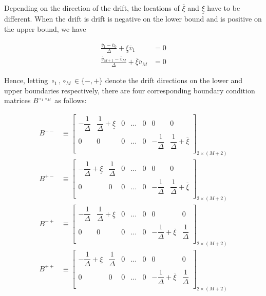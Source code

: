 \documentclass[11pt]{article}
\theoremstyle{definition}
\begin{document}
Depending on the direction of the drift, the locations of $\overline{\xi}$ and $\underline{\xi}$ have to be different. When the drift is drift is negative on the lower bound and is positive on the upper bound, we have

\begin{align}
\frac{\overline{v}_1 - \overline{v}_0}{\Delta} + \underline{\xi} \overline{v}_1 &= 0 \label{eq:mixed-BC1-negative}  \\
\frac{\overline{v}_{M+1} - \overline{v}_M}{\Delta} + \overline{\xi} \overline{v}_{M} &= 0 \label{eq:mixed-BC2-positive}
\end{align}

Hence, letting $\circ_1, \circ_M \in \{-, +\}$ denote the drift directions on the lower and upper boundaries respectively, there are four corresponding boundary condition matrices $B^{\circ_1 \circ_M}$ as follows:
 
\begin{align}
B^{--} &\equiv 
\begin{bmatrix}
-\dfrac{1}{\Delta} & \dfrac{1}{\Delta}  + \underline{\xi} & 0 & \dots & 0 & 0 & 0 \\
0 & 0 & 0 & \dots & 0 & -\dfrac{1}{\Delta} & \dfrac{1}{\Delta} + \overline{\xi}\\
\end{bmatrix}_{2 \times (M+2)} \\
B^{+-} &\equiv 
\begin{bmatrix}
-\dfrac{1}{\Delta} + \underline{\xi} & \dfrac{1}{\Delta} & 0 & \dots & 0 & 0 & 0 \\
0 & 0 & 0 & \dots & 0 & -\dfrac{1}{\Delta} & \dfrac{1}{\Delta} + \overline{\xi}\\
\end{bmatrix}_{2 \times (M+2)} \\
B^{-+} &\equiv 
\begin{bmatrix}
-\dfrac{1}{\Delta}  & \dfrac{1}{\Delta} + \underline{\xi} & 0 & \dots & 0 & 0 & 0 \\
0 & 0 & 0 & \dots & 0 & -\dfrac{1}{\Delta}+ \overline{\xi} & \dfrac{1}{\Delta}\\
\end{bmatrix}_{2 \times (M+2)} \\
B^{++} &\equiv 
\begin{bmatrix}
-\dfrac{1}{\Delta} + \underline{\xi} & \dfrac{1}{\Delta} & 0 & \dots & 0 & 0 & 0 \\
0 & 0 & 0 & \dots & 0 & -\dfrac{1}{\Delta}+ \overline{\xi} & \dfrac{1}{\Delta} \\
\end{bmatrix}_{2 \times (M+2)}
\end{align}
\end{document}
